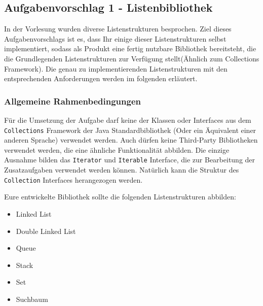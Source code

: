 \documentclass[a4paper,
			   fontsize=12pt]{article}
\begin{document}
\newpage

\subsection*{Aufgabenvorschlag 1 - Listenbibliothek}

In der Vorlesung wurden diverse Listenstrukturen besprochen. Ziel dieses Aufgabenvorschlags ist es, dass Ihr einige dieser Listenstrukturen selbst implementiert, sodass als Produkt eine 
fertig nutzbare Bibliothek bereitsteht, die die Grundlegenden Listenstrukturen zur Verfügung stellt(Ähnlich zum Collections Framework). Die genau zu implementierenden Listenstrukturen mit
den entsprechenden Anforderungen werden im folgenden erläutert.

\subsubsection*{Allgemeine Rahmenbedingungen}

Für die Umsetzung der Aufgabe darf keine der Klassen oder Interfaces aus dem \texttt{Collections} Framework der Java Standardbibliothek (Oder ein Äquivalent einer anderen Sprache) verwendet werden. Auch dürfen keine Third-Party Bibliotheken
verwendet werden, die eine ähnliche Funktionalität abbilden. Die einzige Ausnahme bilden das \texttt{Iterator} und \texttt{Iterable} Interface, die zur Bearbeitung der Zusatzaufgaben verwendet werden können. Natürlich kann die Struktur des
\texttt{Collection} Interfaces herangezogen werden.

Eure entwickelte Bibliothek sollte die folgenden Listenstrukturen abbilden:
\begin{itemize}
	\item Linked List
	\item Double Linked List
	\item Queue
	\item Stack
	\item Set
	\item Suchbaum
\end{itemize}
\end{document}
